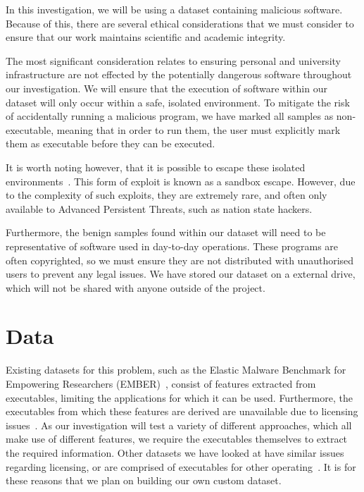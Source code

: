 \documentclass[twocolumn]{article}
\begin{document}
In this investigation, we will be using a dataset containing malicious software. Because of this, there are several ethical considerations that we must consider to ensure that our work maintains scientific and academic integrity. 

The most significant consideration relates to ensuring personal and university infrastructure are not effected by the potentially dangerous software throughout our investigation. We will ensure that the execution of software within our dataset will only occur within a safe, isolated environment. To mitigate the risk of accidentally running a malicious program, we have marked all samples as non-executable, meaning that in order to run them, the user must explicitly mark them as executable before they can be executed.

It is worth noting however, that it is possible to escape these isolated environments~\cite{beer2022forcedentry}. This form of exploit is known as a sandbox escape. However, due to the complexity of such exploits, they are extremely rare, and often only available to Advanced Persistent Threats, such as nation state hackers. 

Furthermore, the benign samples found within our dataset will need to be representative of software used in day-to-day operations. These programs are often copyrighted, so we must ensure they are not distributed with unauthorised users to prevent any legal issues. We have stored our dataset on a external drive, which will not be shared with anyone outside of the project. 

\section{Data}

Existing datasets for this problem, such as the Elastic Malware Benchmark for Empowering Researchers (EMBER)~\cite{anderson2018ember}, consist of features extracted from executables, limiting the applications for which it can be used. Furthermore, the executables from which these features are derived are unavailable due to licensing issues~\cite{harang2020sorel20m}. As our investigation will test a variety of different approaches, which all make use of different features, we require the executables themselves to extract the required information. Other datasets we have looked at have similar issues regarding licensing, or are comprised of executables for other operating~\cite{freitas2022malnetlargescaleimagedatabase}. It is for these reasons that we plan on building our own custom dataset. 
\end{document}
